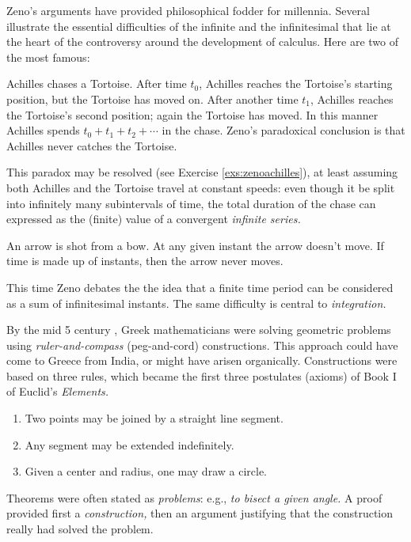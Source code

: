 Zeno's arguments have provided philosophical fodder for millennia. Several illustrate the essential difficulties of the infinite and the infinitesimal that lie at the heart of the controversy around the development of calculus. Here are two of the most famous:
\begin{description}\itemsep2pt
  \item[\normalfont\emph{Achilles and Tortoise}] Achilles chases a Tortoise. After time $t_0$, Achilles reaches the Tortoise's starting position, but the Tortoise has moved on. After another time $t_1$, Achilles reaches the Tortoise's second position; again the Tortoise has moved. In this manner Achilles spends $t_0+t_1+t_2+\cdots$ in the chase. Zeno's paradoxical conclusion is that Achilles never catches the Tortoise.\par
  This paradox may be resolved (see Exercise \ref{exs:zenoachilles}), at least assuming both Achilles and the Tortoise travel at constant speeds: even though it be split into infinitely many subintervals of time, the total duration of the chase can expressed as the (finite) value of a convergent \emph{infinite series.}
  \item[\normalfont\emph{Arrow paradox}] An arrow is shot from a bow. At any given instant the arrow doesn't move. If time is made up of instants, then the arrow never moves.\par
  This time Zeno debates the the idea that a finite time period can be considered as a sum of infinitesimal instants. The same difficulty is central to \emph{integration.}
\end{description}


\label{pg:construction}

By the mid 5\th{} century \!\BC, Greek mathematicians were solving geometric problems using \emph{ruler-and-compass} (peg-and-cord) constructions. This approach could have come to Greece from India, or might have arisen organically. Constructions were based on three rules, which became the first three postulates (axioms) of Book I of Euclid's \emph{Elements.}
\begin{enumerate}\itemsep2pt
  \item Two points may be joined by a straight line segment.
  \item Any segment may be extended indefinitely.
  \item Given a center and radius, one may draw a circle.
\end{enumerate}
Theorems were often stated as \emph{problems}: e.g., \emph{to bisect a given angle.} A proof provided first a \emph{construction,} then an argument justifying that the construction really had solved the problem.

